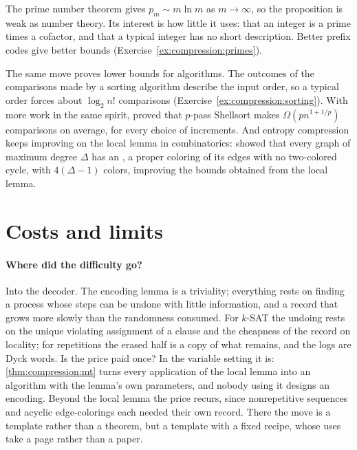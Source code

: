 \begin{refsection}
The prime number theorem gives $p_m\sim m\ln m$ as $m\to\infty$, so the proposition is weak as number theory. Its interest is how little it uses: that an integer is a prime times a cofactor, and that a typical integer has no short description. Better prefix codes give better bounds (Exercise~\ref{ex:compression:primes}).

The same move proves lower bounds for algorithms. The outcomes of the comparisons made by a sorting algorithm describe the input order, so a typical order forces about $\log_2n!$ comparisons (Exercise~\ref{ex:compression:sorting}). With more work in the same spirit, \textcite{JiangLiVitanyi2000} proved that $p$-pass Shellsort makes $\Omega(pn^{1+1/p})$ comparisons on average, for every choice of increments. And entropy compression keeps improving on the local lemma in combinatorics: \textcite{EsperetParreau2013} showed that every graph of maximum degree $\Delta$ has an , a proper coloring of its edges with no two-colored cycle, with $4(\Delta-1)$ colors, improving the bounds obtained from the local lemma.

\section{Costs and limits}\label{sec:compression:costs}

\paragraph{Where did the difficulty go?} Into the decoder. The encoding lemma is a triviality; everything rests on finding a process whose steps can be undone with little information, and a record that grows more slowly than the randomness consumed. For $k$-SAT the undoing rests on the unique violating assignment of a clause and the cheapness of the record on locality; for repetitions the erased half is a copy of what remains, and the logs are Dyck words. Is the price paid once? In the variable setting it is: \cref{thm:compression:mt} turns every application of the local lemma into an algorithm with the lemma's own parameters, and nobody using it designs an encoding. Beyond the local lemma the price recurs, since nonrepetitive sequences and acyclic edge-colorings each needed their own record. There the move is a template rather than a theorem, but a template with a fixed recipe, whose uses take a page rather than a paper.


\end{refsection}
